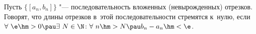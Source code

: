 
Пусть $\big\{[a_n,b_n]\big\}$ "--- последовательность вложенных (невырожденных) отрезков. Говорят,
 что длины отрезков в~этой последовательности стремятся к~нулю, если $\forall\  \e\hm>0\pau
\exists\  N\in \N\colon \forall\  n\hm>N\pau b_n-a_n\hm<\e$.
